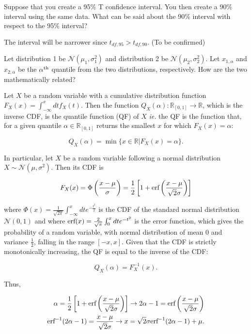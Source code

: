 \documentclass{homework}
\begin{document}
\begin{tcolorbox}[title=Question 6]
Suppose that you create a 95\% T confidence interval. You then create a 90\% interval using the same data. What can be said about the 90\% interval with respect to the 95\% interval?
\end{tcolorbox}

The interval will be narrower since $t_{df, 95} > t_{df, 90}$. (To be confirmed) \\

\begin{tcolorbox}[title=Question 7]
Let distribution 1 be $\mathcal{N}(\mu_1, \sigma_1^2)$ and distribution 2 be $\mathcal{N}(\mu_2,\sigma_2^2)$. Let $x_{1,\alpha}$ and $x_{2,\alpha}$ be the $\alpha^{\textnormal{th}}$ quantile from the two distributions, respectively. How are the two mathematically related?
\end{tcolorbox}

Let $X$ be a random variable with a cumulative distribution function $F_{X}(x) = \int_{-\infty}^{x}dt f_{X}(t)$. Then the function $Q_{X}(\alpha):\mathds{R}_{[0,1]}\rightarrow\mathds{R}$, which is the inverse CDF, is the quantile function (QF) of $X$ \textit{ie.} the QF is the function that, for a given quantile $\alpha \in \mathds{R}_{[0,1]}$ returns the smallest $x$ for which $F_{X}(x)=\alpha$:

$$
Q_{X}(\alpha) = \min \{x \in \mathds{R} | F_{X}(x) = \alpha\}.
$$

In particular, let $X$ be a random variable following a normal distribution $X \sim \mathcal{N}(\mu, \sigma^2)$. Then its CDF is 

$$
F_{X}(x) = \Phi\left(\frac{x-\mu}{\sigma}\right) = \frac{1}{2}\left[1+\textnormal{erf}\left(\frac{x-\mu}{\sqrt{2}\sigma}\right)\right]
$$

where $\Phi(x) = \frac{1}{\sqrt{2\pi}}\int_{-\infty}^{x} dt e^{-\frac{t^2}{2}}$ is the CDF of the standard normal distribution $\mathcal{N}(0,1)$ and where $\textnormal{erf}(x) = \frac{2}{\sqrt{\pi}} \int_{0}^{x}dt e^{-t^2}$ is the error function, which gives the probability of a random variable, with normal distribution of mean 0 and variance $\frac{1}{2}$, falling in the range $[-x,x]$. Given that the CDF is strictly monotonically increasing, the QF is equal to the inverse of the CDF:

$$
Q_{X}(\alpha) = F_{X}^{-1}(x).
$$

Thus, 

\begin{align*}
    \alpha =  \frac{1}{2}\left[1+\textnormal{erf}\left(\frac{x-\mu}{\sqrt{2}\sigma}\right)\right] \rightarrow 2\alpha - 1 = \textnormal{erf}\left(\frac{x-\mu}{\sqrt{2}\sigma}\right) \\
    \textnormal{erf}^{-1}(2\alpha-1) = \frac{x-\mu}{\sqrt{2}\sigma} \rightarrow x = \sqrt{2}\sigma \textnormal{erf}^{-1}(2\alpha-1) + \mu. 
\end{align*}
\end{document}
